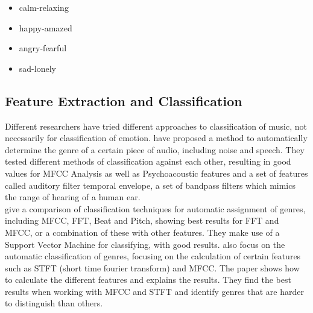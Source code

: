 \documentclass{sigchi-ext}
\begin{document}
\begin{itemize}
	\item calm-relaxing
	\item happy-amazed
	\item angry-fearful
	\item sad-lonely
\end{itemize}

\subsection{Feature Extraction and Classification}
Different researchers have tried different approaches to classification of music, not necessarily for classification of emotion. \cite{Mckinney2003} have proposed a method to automatically determine the genre of a certain piece of audio, including noise and speech. They tested different methods of classification against each other, resulting in good values for MFCC Analysis as well as Psychoacoustic features and a set of features called auditory filter temporal envelope, a set of bandpass filters which mimics the range of hearing of a human ear.\\

\cite{Li2003} give a comparison of classification techniques for automatic assignment of genres, including MFCC, FFT, Beat and Pitch, showing best results for FFT and MFCC, or a combination of these with other features. They make use of a Support Vector Machine for classifying, with good results.
\cite{Tzanetakis2001} also focus on the automatic classification of genres, focusing on the calculation of certain features such as STFT (short time fourier transform) and MFCC. The paper shows how to calculate the different features and explains the results. They find the best results when working with MFCC and STFT and identify genres that are harder to distinguish than others.
\end{document}

